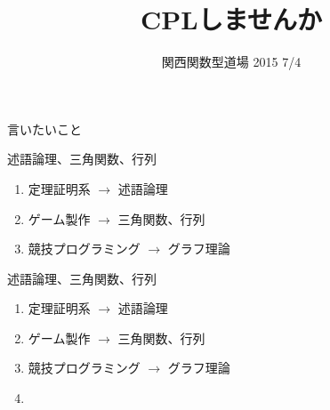 \documentclass[pdflatex,12pt]{beamer}
\title{CPLしませんか}
\date[2015 7/4]{関西関数型道場 2015 7/4}
\begin{document}
\frame{\maketitle}


\begin{frame}{言いたいこと}
    \centering
\end{frame}

\begin{frame}{述語論理、三角関数、行列}
    \Large
    \begin{enumerate}
        \item 定理証明系 $\to$ 述語論理
        \item ゲーム製作 $\to$ 三角関数、行列
        \item 競技プログラミング $\to$ グラフ理論
    \end{enumerate}
\end{frame}

\begin{frame}{述語論理、三角関数、行列}
    \begin{enumerate}
        \item 定理証明系 $\to$ 述語論理
        \item ゲーム製作 $\to$ 三角関数、行列
        \item 競技プログラミング $\to$ グラフ理論
        \item %
    \centering
    \end{enumerate}
\end{frame}
\end{document}
